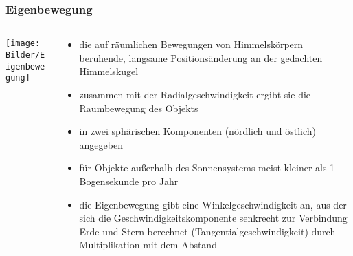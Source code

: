 \documentclass{beamer}
\begin{document}
\begin{frame}\frametitle{Eigenbewegung}

\begin{columns}

\begin{column}{.48\textwidth}

\texttt{[image: Bilder/Eigenbewegung]}

\end{column}

\hfill

\begin{column}{.48\textwidth}

\tiny
\begin{itemize}
\item die auf räumlichen Bewegungen von Himmelskörpern beruhende, langsame Positionsänderung an der gedachten 
Himmelskugel
\item zusammen mit der Radialgeschwindigkeit ergibt sie die Raumbewegung des Objekts
\item in zwei sphärischen Komponenten (nördlich und östlich) angegeben
\item für Objekte außerhalb des Sonnensystems meist kleiner als 1 Bogensekunde pro Jahr
\item die Eigenbewegung gibt eine Winkelgeschwindigkeit an, aus der sich die Geschwindigkeitskomponente senkrecht zur Verbindung Erde und Stern berechnet (Tangentialgeschwindigkeit) durch Multiplikation mit dem Abstand
\end{itemize}

\end{column}

\end{columns}

\end{frame}
\end{document}
